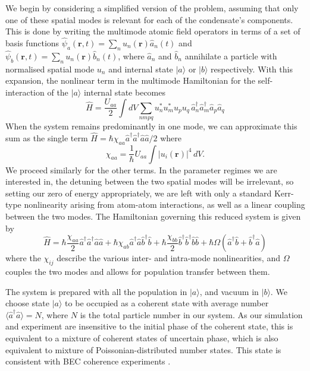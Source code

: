 \documentclass{iopart}
\begin{document}
We begin by considering a simplified version of the problem, assuming that only one of these spatial modes is relevant for each of the condensate's components.  This is done by writing the multimode atomic field operators in terms of a set of basis functions $\hat{\psi}_a({\mathbf{r}},t) = \sum_n u_{n}({\mathbf{r}}) \hat{a}_{n}(t)$ and $\hat{\psi}_b({\mathbf{r}},t) = \sum_n u_{n}({\mathbf{r}}) \hat{b}_{n}(t)$, where $\hat{a}_{n}$ and $\hat{b}_{n}$ annihilate a particle with normalised spatial mode $u_n$ and internal state $|a\rangle$ or $|b\rangle$ respectively. With this expansion, the nonlinear term in the multimode Hamiltonian for the self-interaction of the $|a\rangle$ internal state becomes
\begin{equation}
\hat{H} = \frac{U_{aa}}{2} \int dV \sum_{nmpq} u_n^* u_m^* u_p u_q \, \hat{a}^{\dagger}_{n} \hat{a}^{\dagger}_{m} \hat{a}_{p} \hat{a}_{q} 
\end{equation}
When the system remains predominantly in one mode, we can approximate this sum as the single term $\hat{H} = \hbar\chi_{aa} \hat{a}^{\dagger} \hat{a}^{\dagger} \hat{a} \hat{a}/2$ where
\begin{equation}
\chi_{aa} = \frac{1}{\hbar} U_{aa} \int |u_{i}({\mathbf{r}})|^4 \, dV.
\label{eqChiUequivalence}
\end{equation}
We proceed similarly for the other terms.  In the parameter regimes we are interested in, the detuning between the two spatial modes will be irrelevant, so setting our zero of energy appropriately, we are left with only a standard Kerr-type nonlinearity arising from atom-atom interactions, as well as a linear coupling between the two modes.  The Hamiltonian governing this reduced system is given by
\begin{equation}
\hat{H} = \hbar\frac{\chi_{aa}}{2} \hat{a}^{\dagger} \hat{a}^{\dagger} \hat{a} \hat{a}
          + \hbar\chi_{ab} \hat{a}^{\dagger} \hat{a} \hat{b}^{\dagger} \hat{b}
          + \hbar\frac{\chi_{bb}}{2} \hat{b}^{\dagger} \hat{b}^{\dagger} \hat{b} \hat{b}
          + \hbar\Omega (\hat{a}^{\dagger} \hat{b} + \hat{b}^{\dagger}  \hat{a} )
\label{eqTwoModeHamiltonian}
\end{equation}
where the $\chi_{ij}$ describe the various inter- and intra-mode nonlinearities, and $\Omega$ couples the two modes and allows for population transfer between them.

The system is prepared with all the population in $|a\rangle$, and vacuum in $|b\rangle$. We choose state $|a\rangle$ to be occupied as a coherent state with average number $\langle \hat{a}^{\dagger} \hat{a} \rangle = N$, where $N$ is the total particle number in our system.  As our simulation and experiment are insensitive to the initial phase of the coherent state, this is equivalent to a mixture of coherent states of uncertain phase, which is also equivalent to mixture of Poissonian-distributed number states.  This state is consistent with BEC coherence experiments \cite{Hadzibabic2004}.  
\end{document}
